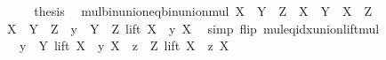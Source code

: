 \begin{isabellebody}
\ \ \isamarkupfalse%
\ \isamarkupfalse%
\ {\isacharquery}{\kern0pt}thesis\ \isacommand{{\isachardot}{\kern0pt}}\isamarkupfalse%
\isanewline
{}\isamarkupfalse%
%
\endisatagproof
{\isafoldproof}%
%
\isadelimproof
\isanewline
%
\endisadelimproof
\isanewline
{}\isamarkupfalse%
\ mul{\isacharunderscore}{\kern0pt}bin{\isacharunderscore}{\kern0pt}union{\isacharunderscore}{\kern0pt}eq{\isacharunderscore}{\kern0pt}bin{\isacharunderscore}{\kern0pt}union{\isacharunderscore}{\kern0pt}mul{\isacharcolon}{\kern0pt}\ {\isachardoublequoteopen}X\ {\isacharasterisk}{\kern0pt}\ {\isacharparenleft}{\kern0pt}Y\ {\isasymunion}\ Z{\isacharparenright}{\kern0pt}\ {\isacharequal}{\kern0pt}\ {\isacharparenleft}{\kern0pt}X\ {\isacharasterisk}{\kern0pt}\ Y{\isacharparenright}{\kern0pt}\ {\isasymunion}\ {\isacharparenleft}{\kern0pt}X\ {\isacharasterisk}{\kern0pt}\ Z{\isacharparenright}{\kern0pt}{\isachardoublequoteclose}\isanewline
%
\isadelimproof
%
\endisadelimproof
%
\isatagproof
{}\isamarkupfalse%
\ {\isacharminus}{\kern0pt}\isanewline
\ \ \isamarkupfalse%
\ {\isachardoublequoteopen}X\ {\isacharasterisk}{\kern0pt}\ {\isacharparenleft}{\kern0pt}Y\ {\isasymunion}\ Z{\isacharparenright}{\kern0pt}\ {\isacharequal}{\kern0pt}\ {\isacharparenleft}{\kern0pt}{\isasymUnion}y\ {\isasymin}\ {\isacharparenleft}{\kern0pt}Y\ {\isasymunion}\ Z{\isacharparenright}{\kern0pt}{\isachardot}{\kern0pt}\ lift\ {\isacharparenleft}{\kern0pt}X\ {\isacharasterisk}{\kern0pt}\ y{\isacharparenright}{\kern0pt}\ X{\isacharparenright}{\kern0pt}{\isachardoublequoteclose}\ \isamarkupfalse%
\ {\isacharparenleft}{\kern0pt}simp\ flip{\isacharcolon}{\kern0pt}\ mul{\isacharunderscore}{\kern0pt}eq{\isacharunderscore}{\kern0pt}idx{\isacharunderscore}{\kern0pt}union{\isacharunderscore}{\kern0pt}lift{\isacharunderscore}{\kern0pt}mul{\isacharparenright}{\kern0pt}\isanewline
\ \ \isamarkupfalse%
\ \isamarkupfalse%
\ {\isachardoublequoteopen}{\isachardot}{\kern0pt}{\isachardot}{\kern0pt}{\isachardot}{\kern0pt}\ {\isacharequal}{\kern0pt}\ {\isacharparenleft}{\kern0pt}{\isasymUnion}y\ {\isasymin}\ Y{\isachardot}{\kern0pt}\ lift\ {\isacharparenleft}{\kern0pt}X\ {\isacharasterisk}{\kern0pt}\ y{\isacharparenright}{\kern0pt}\ X{\isacharparenright}{\kern0pt}\ {\isasymunion}\ {\isacharparenleft}{\kern0pt}{\isasymUnion}z\ {\isasymin}\ Z{\isachardot}{\kern0pt}\ lift\ {\isacharparenleft}{\kern0pt}X\ {\isacharasterisk}{\kern0pt}\ z{\isacharparenright}{\kern0pt}\ X{\isacharparenright}{\kern0pt}{\isachardoublequoteclose}\isanewline

\end{isabellebody}
